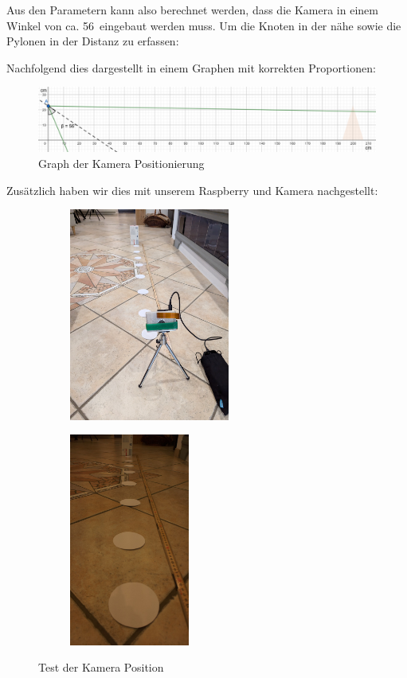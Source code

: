 Aus den Parametern kann also berechnet werden, dass die Kamera in einem Winkel von ca. 56\textdegree\ eingebaut werden muss. Um die Knoten in der nähe sowie die Pylonen in der Distanz zu erfassen:

Nachfolgend dies dargestellt in einem Graphen mit korrekten Proportionen:

\begin{figure}[H]
    \centering
    \includegraphics[width=1\linewidth]{assets/informatik-prototyp/camera/camera_position_exact_bigger.png}
    \caption{Graph der Kamera Positionierung}
    \label{fig:camera-position-exact}
\end{figure}

Zusätzlich haben wir dies mit unserem Raspberry und Kamera nachgestellt:

\begin{figure}[H]
\centering
\begin{subfigure}{0.45\textwidth}
\centering
    \includegraphics[height=7cm]{assets/informatik-prototyp/camera/camera_position_prototype_at_home.jpg}
\end{subfigure}
\begin{subfigure}{0.45\textwidth}
\centering
    \includegraphics[height=7cm]{assets/informatik-prototyp/camera/camera_position_prototype.jpg}
\end{subfigure}
\caption{Test der Kamera Position}
\label{fig:camera-position-prototype}
\end{figure}


